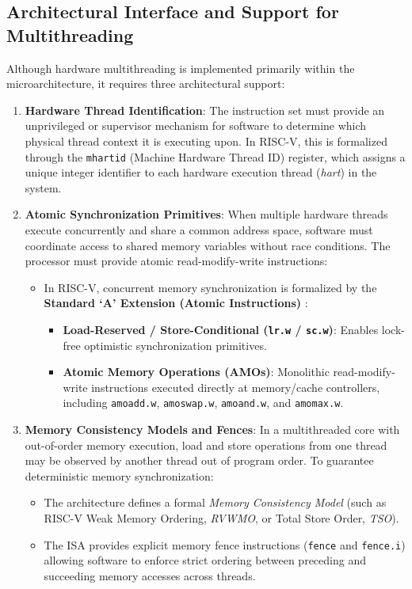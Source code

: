 \subsection{Architectural Interface and Support for Multithreading}

Although hardware multithreading is implemented primarily within the microarchitecture, it requires three architectural support:

\begin{enumerate}
    \item \textbf{Hardware Thread Identification}:
    The instruction set must provide an unprivileged or supervisor mechanism for software to determine which physical thread context it is executing upon. In RISC-V, this is formalized through the \texttt{mhartid} (Machine Hardware Thread ID) register, which assigns a unique integer identifier to each hardware execution thread (\emph{hart}) in the system.
    
    \item \textbf{Atomic Synchronization Primitives}:
    When multiple hardware threads execute concurrently and share a common address space, software must coordinate access to shared memory variables without race conditions. The processor must provide atomic read-modify-write instructions:
    \begin{itemize}
        \item In RISC-V, concurrent memory synchronization is formalized by the \textbf{Standard `A' Extension (Atomic Instructions)} \cite{riscv-spec}:
        \begin{itemize}
            \item \textbf{Load-Reserved / Store-Conditional (\texttt{lr.w} / \texttt{sc.w})}: Enables lock-free optimistic synchronization primitives.
            \item \textbf{Atomic Memory Operations (AMOs)}: Monolithic read-modify-write instructions executed directly at memory/cache controllers, including \texttt{amoadd.w}, \texttt{amoswap.w}, \texttt{amoand.w}, and \texttt{amomax.w}.
        \end{itemize}
    \end{itemize}

    \item \textbf{Memory Consistency Models and Fences}:
    In a multithreaded core with out-of-order memory execution, load and store operations from one thread may be observed by another thread out of program order. To guarantee deterministic memory synchronization:
    \begin{itemize}
        \item The architecture defines a formal \textit{Memory Consistency Model} (such as RISC-V Weak Memory Ordering, \emph{RVWMO}, or Total Store Order, \emph{TSO}).
        
        \item The ISA provides explicit memory fence instructions (\texttt{fence} and \texttt{fence.i}) allowing software to enforce strict ordering between preceding and succeeding memory accesses across threads.
    \end{itemize}
\end{enumerate}


